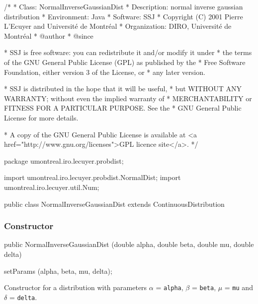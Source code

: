 \begin{code}
\begin{hide}
/*
 * Class:        NormalInverseGaussianDist
 * Description:  normal inverse gaussian distribution
 * Environment:  Java
 * Software:     SSJ 
 * Copyright (C) 2001  Pierre L'Ecuyer and Université de Montréal
 * Organization: DIRO, Université de Montréal
 * @author       
 * @since

 * SSJ is free software: you can redistribute it and/or modify it under
 * the terms of the GNU General Public License (GPL) as published by the
 * Free Software Foundation, either version 3 of the License, or
 * any later version.

 * SSJ is distributed in the hope that it will be useful,
 * but WITHOUT ANY WARRANTY; without even the implied warranty of
 * MERCHANTABILITY or FITNESS FOR A PARTICULAR PURPOSE.  See the
 * GNU General Public License for more details.

 * A copy of the GNU General Public License is available at
   <a href="http://www.gnu.org/licenses">GPL licence site</a>.
 */
\end{hide}
package umontreal.iro.lecuyer.probdist;
\begin{hide}
import umontreal.iro.lecuyer.probdist.NormalDist;
import umontreal.iro.lecuyer.util.Num;
\end{hide}

public class NormalInverseGaussianDist extends ContinuousDistribution\begin{hide} {
   protected double alpha;
   protected double beta;
   protected double gamma;
   protected double delta;
   protected double mu;
\end{hide}
\end{code}
\subsubsection* {Constructor}

\begin{code}

   public NormalInverseGaussianDist (double alpha, double beta, double mu,
                                     double delta)\begin{hide} {
      setParams (alpha, beta, mu, delta);
   }\end{hide}
\end{code}
\begin{tabb}
Constructor for a \nig{} distribution  with parameters $\alpha$ = \texttt{alpha},
 $\beta$ = \texttt{beta}, $\mu$ = \texttt{mu} and $\delta$ = \texttt{delta}.
\end{tabb}

